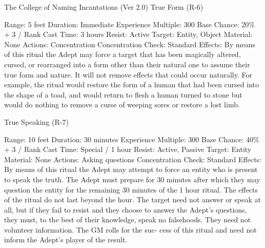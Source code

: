 \begin{Chapter}{The College of Naming Incantations (Ver 2.0)}
True Form (R-6) 

Range: 5 feet 
Duration: Immediate 
Experience Multiple: 300 
Base Chance: 20\% + 3 / Rank 
Cast Time: 3 hours 
Resist: Active 
Target: Entity, Object 
Material: None 
Actions: Concentration 
Concentration Check: Standard 
Effects:  By  means  of  this  ritual  the  Adept  may 
force  a  target  that  has  been  magically  altered, 
cursed,  or  rearranged  into  a  form  other  than  their 
natural one to assume their true form and nature. It 
will  not  remove  effects  that  could  occur  naturally. 
For example, the ritual would restore the form of a 
human  that  had  been  cursed  into  the  shape  of  a 
toad,  and  would  return  to  flesh  a  human  turned  to 
stone  but  would  do  nothing  to  remove  a  curse  of 
weeping sores or restore a lost limb. 

True Speaking (R-7) 

Range: 10 feet 
Duration: 30 minutes 
Experience Multiple: 300 
Base Chance: 40\% + 3 / Rank 
Cast Time: Special / 1 hour 
Resist: Active, Passive 
Target: Entity 
Material: None 
Actions: Asking questions 
Concentration Check: Standard 
Effects:  By  means  of  this  ritual  the  Adept  may 
attempt  to  force  an  entity  who  is  present  to  speak 
the  truth.  The  Adept  must  prepare  for  30  minutes 
after  which  they  may  question  the  entity  for  the 
remaining  30  minutes  of  the  1  hour  ritual.  The 
effects  of  the  ritual  do  not  last  beyond  the  hour. 
The  target  need  not  answer  or  speak  at  all,  but  if 
they  fail  to  resist  and  they  choose  to  answer  the 
Adept’s  questions,  they  must,  to  the  best  of  their 
knowledge,  speak  no  falsehoods.  They  need  not 
volunteer  information.  The  GM  rolls  for  the  suc-
cess of this ritual and need not inform the Adept’s 
player of the result. 

\end{Chapter}
